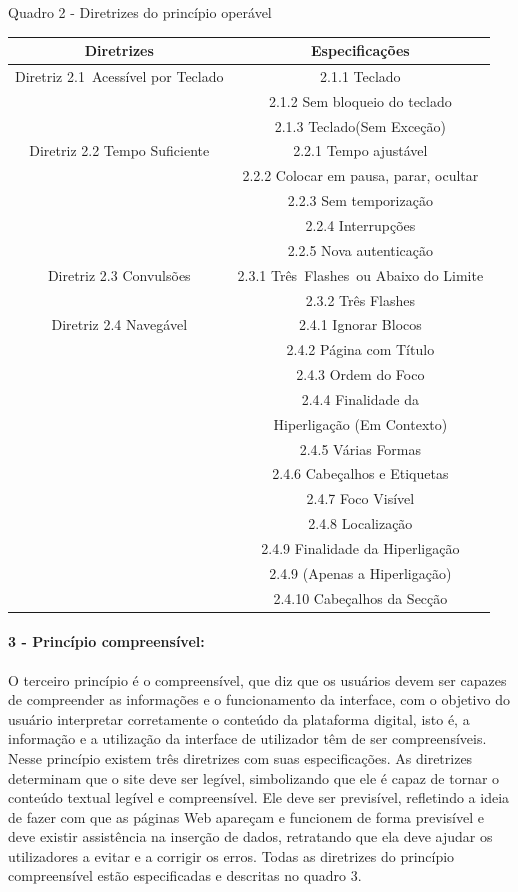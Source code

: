 \documentclass[a4paper]{article}
\begin{document}
\begin{titlepage}
Quadro 2 - Diretrizes do princípio operável\\[-1cm]
\begin{center}
	\fontsize{8pt}{8pt}\selectfont
	\begin{longtable}{|c|c|}
		\hline
		Diretrizes & Especificações \\
		\hline
		Diretriz 2.1 Acessível por Teclado& 2.1.1 Teclado\\
		& 2.1.2 Sem bloqueio do teclado\\
		& 2.1.3 Teclado(Sem Exceção)\\
		\hline
		Diretriz 2.2 Tempo Suficiente & 2.2.1 Tempo ajustável \\
		& 2.2.2 Colocar em pausa, parar, ocultar\\
		& 2.2.3 Sem temporização\\
		& 2.2.4 Interrupções\\
		& 2.2.5 Nova autenticação\\
		\hline
		Diretriz 2.3 Convulsões& 2.3.1 Três Flashes ou Abaixo do Limite\\
		& 2.3.2 Três Flashes\\
		\hline
		Diretriz 2.4 Navegável& 2.4.1 Ignorar Blocos\\
		& 2.4.2 Página com Título\\
		& 2.4.3 Ordem do Foco\\
		& 2.4.4 Finalidade da\\
		& Hiperligação (Em Contexto)\\
		& 2.4.5 Várias Formas\\
		& 2.4.6 Cabeçalhos e Etiquetas\\
		& 2.4.7 Foco Visível\\
		& 2.4.8 Localização\\
		& 2.4.9 Finalidade da Hiperligação\\
		& 2.4.9 (Apenas a Hiperligação)\\
		& 2.4.10 Cabeçalhos da Secção\\
		\hline
	\end{longtable}
\end{center}

\paragraph{3 - Princípio compreensível: }

O terceiro princípio é o compreensível, que diz que os usuários devem ser capazes de compreender as informações e o funcionamento da interface, com o objetivo do usuário interpretar corretamente o conteúdo da plataforma digital, isto é, a informação e a utilização da interface de utilizador têm de ser compreensíveis. Nesse princípio existem três diretrizes com suas especificações. As diretrizes determinam que o site deve ser legível, simbolizando que ele é capaz de tornar o conteúdo textual legível e compreensível. Ele deve ser previsível, refletindo a ideia de fazer com que as páginas Web apareçam e funcionem de forma previsível e deve existir assistência na inserção de dados, retratando que ela deve ajudar os utilizadores a evitar e a corrigir os erros. Todas as diretrizes do princípio compreensível estão especificadas e descritas no quadro 3.


\end{titlepage}
\end{document}
